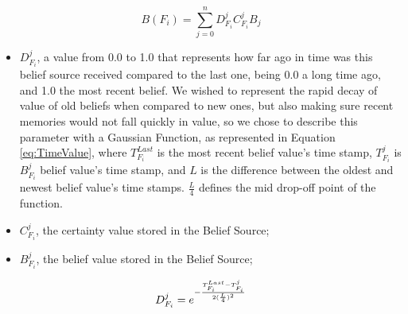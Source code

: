 \begin{equation}
B(F_i) = \sum_{j=0}^{n} D^j_{F_i} C^j_{F_i} B_j 
\label{eq:TrustFeatureBeliefValueCalculation}
\end{equation}

\begin{itemize}
    \item $D^j_{F_i}$, a value from 0.0 to 1.0 that represents how far ago in time was this belief source received compared to the last one, being 0.0 a long time ago, and 1.0 the most recent belief. We wished to represent the rapid decay of value of old beliefs when compared to new ones, but also making sure recent memories would not fall quickly in value, so we chose to describe this parameter with a Gaussian Function, as represented in Equation \ref{eq:TimeValue}, where $T^{Last}_{F_i}$ is the most recent belief value's time stamp, $T^j_{F_i}$ is $B_{F_i}^j$ belief value's time stamp, and $L$ is the difference between the oldest and newest belief value's time stamps. $\frac{L}{4}$ defines the mid drop-off point of the function.
    \item $C^j_{F_i}$, the certainty value stored in the Belief Source;
    \item $B^j_{F_i}$, the belief value stored in the Belief Source;
\end{itemize}


\begin{equation}
D^j_{F_i} = e^{-\frac{T^{Last}_{F_i} - T^j_{F_i}}{2(\frac{L}{4})^2}}
\label{eq:TimeValue}
\end{equation}


% 


